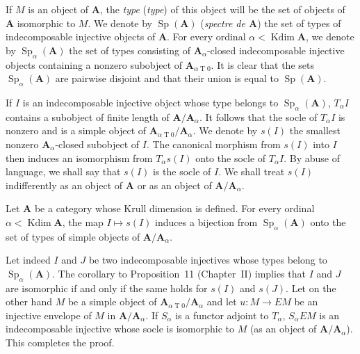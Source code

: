 If $M$ is an object of $\mathbf{A}$, the \emph{type} (\emph{type}) of
this object will be the set of objects of $\mathbf{A}$ isomorphic to
$M$. We denote by $\operatorname{Sp}(\mathbf{A})$
(\emph{spectre de $\mathbf{A}$}) the set of types of indecomposable
injective objects of $\mathbf{A}$. For every ordinal
$\alpha < \operatorname{Kdim} \mathbf{A}$, we denote by
$\operatorname{Sp}_\alpha(\mathbf{A})$ the set of types consisting of
$\mathbf{A}_\alpha$-closed indecomposable injective objects containing
a nonzero subobject of
$\mathbf{A}_{\alpha \mathbin{T} 0}$. It is clear that the sets
$\operatorname{Sp}_\alpha(\mathbf{A})$ are pairwise disjoint and that
their union is equal to $\operatorname{Sp}(\mathbf{A})$.

If $I$ is an indecomposable injective object whose type belongs to
$\operatorname{Sp}_\alpha(\mathbf{A})$, $T_\alpha I$ contains a
subobject of finite length of $\mathbf{A}/\mathbf{A}_\alpha$. It
follows that the socle of $T_\alpha I$ is nonzero and is a simple
object of
$\mathbf{A}_{\alpha \mathbin{T} 0}/\mathbf{A}_\alpha$. We denote by
$s(I)$ the smallest nonzero $\mathbf{A}_\alpha$-closed subobject of
$I$. The canonical morphism from $s(I)$ into $I$ then induces an
isomorphism from $T_\alpha s(I)$ onto the socle of $T_\alpha I$. By
abuse of language, we shall say that $s(I)$ is the socle of $I$. We
shall treat $s(I)$ indifferently as an object of $\mathbf{A}$ or as an
object of $\mathbf{A}/\mathbf{A}_\alpha$.

\begin{proposition}
Let $\mathbf{A}$ be a category whose Krull dimension is defined. For
every ordinal $\alpha < \operatorname{Kdim} \mathbf{A}$, the map
$I \mapsto s(I)$ induces a bijection from
$\operatorname{Sp}_\alpha(\mathbf{A})$ onto the set of types of simple
objects of $\mathbf{A}/\mathbf{A}_\alpha$.
\end{proposition}

Let indeed $I$ and $J$ be two indecomposable injectives whose types
belong to $\operatorname{Sp}_\alpha(\mathbf{A})$. The corollary to
Proposition~11 (Chapter~II) implies that $I$ and $J$ are isomorphic if
and only if the same holds for $s(I)$ and $s(J)$. Let on the other
hand $M$ be a simple object of
$\mathbf{A}_{\alpha \mathbin{T} 0}/\mathbf{A}_\alpha$ and let
$u\colon M \to EM$ be an injective envelope of $M$ in
$\mathbf{A}/\mathbf{A}_\alpha$. If $S_\alpha$ is a functor adjoint to
$T_\alpha$, $S_\alpha EM$ is an indecomposable injective whose socle
is isomorphic to $M$ (as an object of
$\mathbf{A}/\mathbf{A}_\alpha$). This completes the proof.

